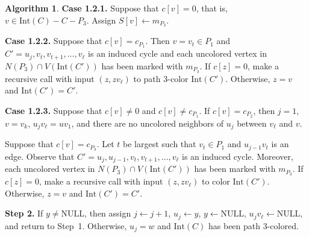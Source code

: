 \documentclass[12pt,letterpaper]{article}
\theoremstyle{plain}
\theoremstyle{definition}
\theoremstyle{break}
\newtheorem{algorithm}[lemma]{Algorithm}     %
\begin{document}
\begin{algorithm}
\textbf{Case 1.2.1.} Suppose that $c[v]=0$, that is, $v\in\text{Int}(C)-C-P_3$.
Assign $S[v]\leftarrow m_{P_3}$.

\textbf{Case 1.2.2.} Suppose that $c[v]=c_{P_1}$. Then
$v=v_t\in P_1$ and $C'=u_j,v_t,v_{t+1},\ldots,v_\ell$ is an
induced
cycle and each uncolored vertex in $N(P_3)\cap
V(\text{Int}(C'))$ has been marked with $m_{P_3}$.
If $c[z]=0$, make a recursive call with input $(z, zv_\ell)$
to path $3$-color $\text{Int}(C')$.
Otherwise, $z=v$ and $\text{Int}(C')=C'$.

\textbf{Case 1.2.3.} Suppose that $c[v]\ne 0$ and $c[v]\ne c_{P_1}$.
If $c[v]=c_{P_2}$, then $j=1$, $v=v_k$, $u_jv_\ell=uv_1$, and there are no
uncolored neighbors of $u_j$ between $v_\ell$ and $v$.

Suppose that $c[v]=c_{P_3}$. Let $t$ be largest such that
$v_t\in P_1$ and $u_{j-1}v_{t}$ is an edge. Observe that
$C'=u_j,u_{j-1},v_t,v_{t+1},\ldots,v_\ell$ is an induced cycle. Moreover,
each uncolored vertex in $N(P_3)\cap
V(\text{Int}(C'))$ has been marked with $m_{P_3}$.
If $c[z]=0$, make a recursive call with input $(z, zv_\ell)$ to
color $\text{Int}(C')$. Otherwise, $z=v$ and $\text{Int}(C')=C'$.

\textbf{Step 2.} If $y\ne\text{NULL}$, then 
assign $j\leftarrow j+1$, $u_j\leftarrow y$, $y\leftarrow\text{NULL}$,
$u_jv_\ell\leftarrow\text{NULL}$, and return to Step~1.
Otherwise, $u_j=w$ and $\text{Int}(C)$ has been path
$3$-colored.
\end{algorithm}
\end{document}
